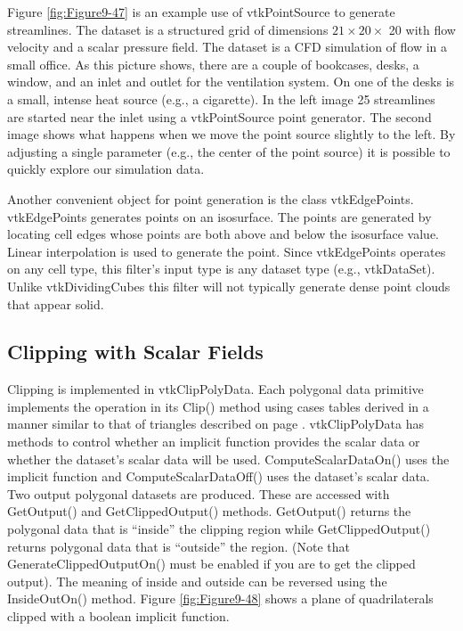 Figure \ref{fig:Figure9-47} is an example use of vtkPointSource to generate streamlines. The dataset is a structured grid of dimensions $21 \times 20 \times$ 20 with flow velocity and a scalar pressure field. The dataset is a CFD simulation of flow in a small office. As this picture shows, there are a couple of bookcases, desks, a window, and an inlet and outlet for the ventilation system. On one of the desks is a small, intense heat source (e.g., a cigarette). In the left image 25 streamlines are started near the inlet using a vtkPointSource point generator. The second image shows what happens when we move the point source slightly to the left. By adjusting a single parameter (e.g., the center of the point source) it is possible to quickly explore our simulation data.

Another convenient object for point generation is the class vtkEdgePoints. vtkEdgePoints generates points on an isosurface. The points are generated by locating cell edges whose points are both above and below the isosurface value. Linear interpolation is used to generate the point. Since vtkEdgePoints operates on any cell type, this filter's input type is any dataset type (e.g., vtkDataSet). Unlike vtkDividingCubes this filter will not typically generate dense point clouds that appear solid.

\subsection{Clipping with Scalar Fields}
Clipping is implemented in vtkClipPolyData. Each polygonal data primitive implements the operation in its Clip() method using cases tables derived in a manner similar to that of triangles described on page \pageref{subsec:clipping_with_scalar_fields}. vtkClipPolyData has methods to control whether an implicit function provides the scalar data or whether the dataset's scalar data will be used. ComputeScalarDataOn() uses the implicit function and ComputeScalarDataOff() uses the dataset's scalar data. Two output polygonal datasets are produced. These are accessed with GetOutput() and GetClippedOutput() methods. GetOutput() returns the polygonal data that is ``inside'' the clipping region while GetClippedOutput() returns polygonal data that is ``outside'' the region. (Note that GenerateClippedOutputOn() must be enabled if you are to get the clipped output). The meaning of inside and outside can be reversed using the InsideOutOn() method. Figure \ref{fig:Figure9-48} shows a plane of quadrilaterals clipped with a boolean implicit function.

